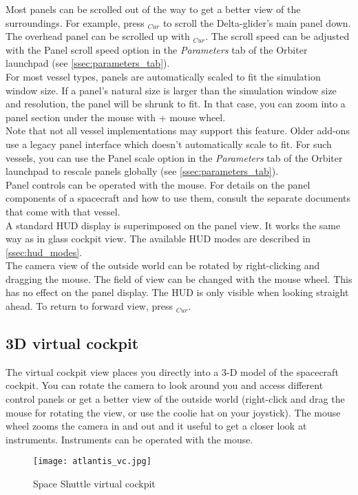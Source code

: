 \documentclass[Orbiter User Manual.tex]{subfiles}
\begin{document}
\noindent
Most panels can be scrolled out of the way to get a better view of the surroundings. For example, press \DArrow$_{Cur}$ to scroll the Delta-glider's main panel down. The overhead panel can be scrolled up with \UArrow$_{Cur}$. The scroll speed can be adjusted with the Panel scroll speed option in the \textit{Parameters} tab of the Orbiter launchpad (see \ref{ssec:parameters_tab}).\\
For most vessel types, panels are automatically scaled to fit the simulation window size. If a panel's natural size is larger than the simulation window size and resolution, the panel will be shrunk to fit. In that case, you can zoom into a panel section under the mouse with \Ctrl + mouse wheel.\\
Note that not all vessel implementations may support this feature. Older add-ons use a legacy panel interface which doesn't automatically scale to fit. For such vessels, you can use the Panel scale option in the \textit{Parameters} tab of the Orbiter launchpad to rescale panels globally (see \ref{ssec:parameters_tab}).\\
Panel controls can be operated with the mouse. For details on the panel components of a spacecraft and how to use them, consult the separate documents that come with that vessel.\\
A standard HUD display is superimposed on the panel view. It works the same way as in glass cockpit view. The available HUD modes are described in \ref{ssec:hud_modes}.\\
The camera view of the outside world can be rotated by right-clicking and dragging the mouse. The field of view can be changed with the mouse wheel. This has no effect on the panel display. The HUD is only visible when looking straight ahead. To return to forward view, press \Home$_{Cur}$.


\subsection{3D virtual cockpit}
The virtual cockpit view places you directly into a 3-D model of the spacecraft cockpit. You can rotate the camera to look around you and access different control panels or get a better view of the outside world (right-click and drag the mouse for rotating the view, or use the coolie hat on your joystick). The mouse wheel zooms the camera in and out and it useful to get a closer look at instruments. Instruments can be operated with the mouse.

\begin{figure}[H]
  \centering
  \texttt{[image: atlantis\_vc.jpg]}
  \caption{Space Shuttle virtual cockpit}
\end{figure}
\end{document}
